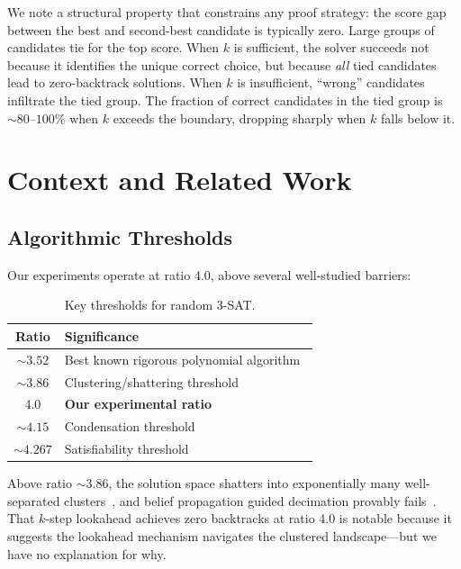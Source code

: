 \documentclass[11pt,a4paper]{article}
\begin{document}
We note a structural property that constrains any proof strategy: the score gap between the best and second-best candidate is typically zero. Large groups of candidates tie for the top score. When $k$ is sufficient, the solver succeeds not because it identifies the unique correct choice, but because \emph{all} tied candidates lead to zero-backtrack solutions. When $k$ is insufficient, ``wrong'' candidates infiltrate the tied group. The fraction of correct candidates in the tied group is ${\sim}80$--$100\%$ when $k$ exceeds the boundary, dropping sharply when $k$ falls below it.

\section{Context and Related Work}\label{sec:context}

\subsection{Algorithmic Thresholds}

Our experiments operate at ratio 4.0, above several well-studied barriers:

\begin{table}[h]
\centering
\begin{tabular}{@{}cl@{}}
\toprule
Ratio & Significance \\
\midrule
${\sim}3.52$ & Best known rigorous polynomial algorithm~\citep{cojaoghlan2010better} \\
${\sim}3.86$ & Clustering/shattering threshold~\citep{achlioptas2008algorithmic} \\
4.0   & \textbf{Our experimental ratio} \\
${\sim}4.15$ & Condensation threshold \\
${\sim}4.267$ & Satisfiability threshold~\citep{dingsly2015proof} \\
\bottomrule
\end{tabular}
\caption{Key thresholds for random 3-SAT.}
\label{tab:thresholds}
\end{table}

Above ratio ${\sim}3.86$, the solution space shatters into exponentially many well-separated clusters~\citep{achlioptas2008algorithmic}, and belief propagation guided decimation provably fails~\citep{cojaoghlan2011belief}. That $k$-step lookahead achieves zero backtracks at ratio 4.0 is notable because it suggests the lookahead mechanism navigates the clustered landscape---but we have no explanation for why.
\end{document}
